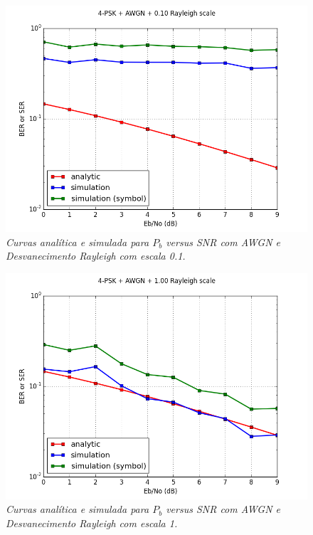 \documentclass[a4paper,twocolumn]{article}
\begin{document}
\begin{figure}[h]
    \label{fig:4-psk_awgn_10_rayleigh}
    \centering
    \includegraphics[scale=0.40]{4-psk_awgn_10_rayleigh}
    \caption{\textit{Curvas analítica e simulada para $P_b$ versus SNR com AWGN e Desvanecimento Rayleigh com escala 0.1.}}
\end{figure}

\begin{figure}[h]
    \label{fig:4-psk_awgn_100_rayleigh}
    \centering
    \includegraphics[scale=0.40]{4-psk_awgn_100_rayleigh}
    \caption{\textit{Curvas analítica e simulada para $P_b$ versus SNR com AWGN e Desvanecimento Rayleigh com escala 1.}}
\end{figure}
\end{document}
